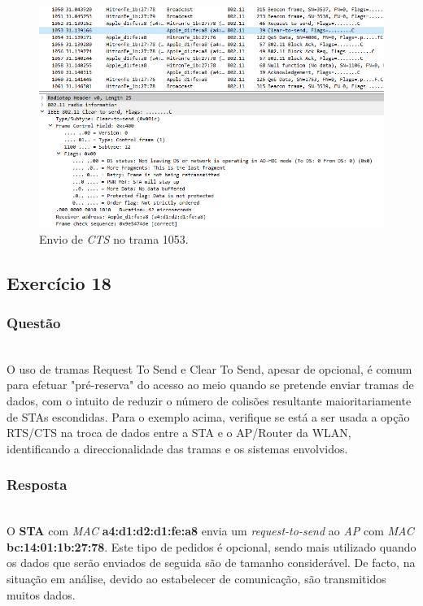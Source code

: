 \documentclass{llncs}
\begin{document}
\begin{figure}
  \begin{center}
  \includegraphics[scale=0.6]{./imagens/p17cts.png} 
  \end{center}
  \caption{Envio de \textit{CTS} no trama 1053.}
  \label{fig:control_frame}
\end{figure}

\clearpage
\subsection{Exercício 18}
\subsubsection{Questão}\rule[-10pt]{0pt}{10pt}\\

O uso de tramas Request To Send e Clear To Send, apesar de opcional, é comum para efetuar "pré-reserva" do acesso ao meio quando se pretende enviar tramas de dados, com o intuito de reduzir o número de colisões resultante maioritariamente de STAs escondidas. Para o exemplo acima, verifique se está a ser usada a opção RTS/CTS na troca de dados entre a STA e o AP/Router da WLAN, identificando a direccionalidade das tramas e os sistemas envolvidos.

\subsubsection{Resposta}\rule[-10pt]{0pt}{10pt}\\

O \textbf{STA} com \textit{MAC} \textbf{a4:d1:d2:d1:fe:a8} envia um \textit{request-to-send} ao \textit{AP} com \textit{MAC} \textbf{bc:14:01:1b:27:78}.
Este tipo de pedidos é opcional, sendo mais utilizado quando os dados que serão enviados de seguida são de tamanho considerável. De facto, na situação em análise, devido ao estabelecer de comunicação, são transmitidos muitos dados.
\end{document}
